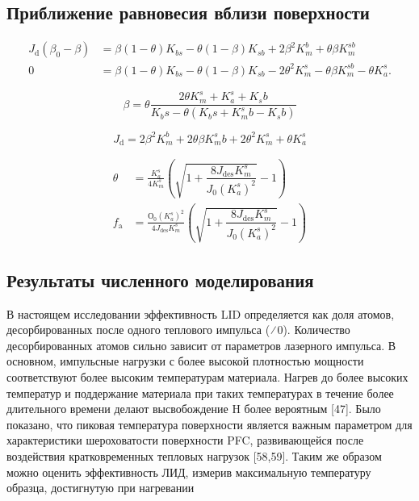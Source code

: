 \subsection{Приближение равновесия вблизи поверхности}


\begin{subequations}
    \begin{align}
        J_\mathrm{d}(\beta_0 - \beta) & = \beta (1-\theta) K_{bs} - \theta (1-\beta) K_{sb} + 2\beta^2 K_m^b + \theta\beta K_m^{sb}                   \\
        0                             & = \beta (1-\theta) K_{bs} - \theta (1-\beta) K_{sb} - 2\theta^2 K_m^s - \theta\beta K_m^{sb} - \theta K_a^s .
    \end{align}
\end{subequations}

\begin{equation}
    \beta = \theta \dfrac{2\theta K_m^s + K_a^s + K_sb}{K_bs - \theta (K_bs + K_m^sb - K_sb)}
\end{equation}

\begin{equation}
    J_\mathrm{d} = 2\beta^2 K_m^b + 2\theta\beta K_m^sb + 2\theta^2 K_m^s + \theta K_a^s
\end{equation}

\begin{subequations}
    \begin{align}
        \theta       & = \frac{K_a^s}{4 K_m^s} \left( \sqrt{1+\dfrac{8J_\mathrm{des}K_m^s}{J_0 (K_a^s)^2}} -1 \right)                        \\
        f_\mathrm{a} & = \frac{О_0 (K_a^s)^2}{4 J_\mathrm{des} K_m^s} \left( \sqrt{1+\dfrac{8J_\mathrm{des}K_m^s}{J_0 (K_a^s)^2}} -1 \right)
    \end{align}
\end{subequations}

\subsection{Результаты численного моделирования}\label{subsec:ch4/seс2/subsec3}

В настоящем исследовании эффективность LID определяется как доля атомов, десорбированных после одного теплового импульса (    ∕ 0). Количество десорбированных атомов сильно зависит от параметров лазерного импульса. В основном, импульсные нагрузки с более высокой плотностью мощности соответствуют более высоким температурам материала. Нагрев до более высоких температур и поддержание материала при таких температурах в течение более длительного времени делают высвобождение H более вероятным [47]. Было показано, что пиковая температура поверхности является важным параметром для характеристики шероховатости поверхности PFC, развивающейся после воздействия кратковременных тепловых нагрузок [58,59]. Таким же образом можно оценить эффективность ЛИД, измерив максимальную температуру образца, достигнутую при нагревании

